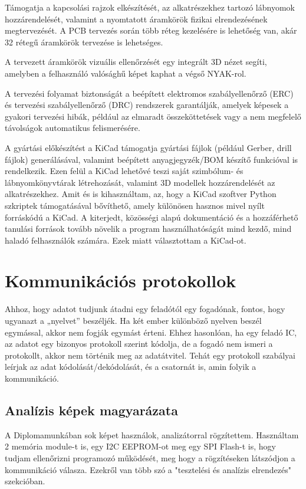 \documentclass[a4paper,12pt,oneside]{book}
\begin{document}
Támogatja a kapcsolási rajzok elkészítését, az alkatrészekhez tartozó lábnyomok hozzárendelését, valamint a nyomtatott áramkörök fizikai elrendezésének megtervezését. A PCB tervezés során több réteg kezelésére is lehetőség van, akár 32 rétegű áramkörök tervezése is lehetséges. 

A tervezett áramkörök vizuális ellenőrzését egy integrált 3D nézet segíti, amelyben a felhasználó valósághű képet kaphat a végső NYAK-rol. 

A tervezési folyamat biztonságát a beépített elektromos szabályellenőrző (ERC) és tervezési szabályellenőrző (DRC) rendszerek garantálják, amelyek képesek a gyakori tervezési hibák, például az elmaradt összeköttetések vagy a nem megfelelő távolságok automatikus felismerésére. 

A gyártási előkészítést a KiCad támogatja gyártási fájlok (például Gerber, drill fájlok) generálásával, valamint beépített anyagjegyzék/BOM készítő funkcióval is rendelkezik. Ezen felül a KiCad lehetővé teszi saját szimbólum- és lábnyomkönyvtárak létrehozását, valamint 3D modellek hozzárendelését az alkatrészekhez. 
Amit és is kihasználtam, az, hogy a KiCad szoftver Python szkriptek támogatásával bővíthető, amely különösen hasznos mivel nyílt forráskódú a KiCad. A kiterjedt, közösségi alapú dokumentáció és a hozzáférhető tanulási források tovább növelik a program használhatóságát mind kezdő, mind haladó felhasználók számára. Ezek miatt választottam a KiCad-ot.

\section{Kommunikációs protokollok}
Ahhoz, hogy adatot tudjunk átadni egy feladótól egy fogadónak, fontos, hogy ugyanazt a „nyelvet” beszéljék. Ha két ember különböző nyelven beszél egymással, akkor nem fogják egymást érteni. Ehhez hasonlóan, ha egy feladó IC, az adatot egy bizonyos protokoll szerint kódolja, de a fogadó nem ismeri a protokollt, akkor nem történik meg az adatátvitel. Tehát egy protokoll szabályai leírjak az adat kódolását/dekódolását, és a csatornát is, amin folyik a kommunikáció. 

\subsection{Analízis képek magyarázata}

A Diplomamunkában sok képet használok, analizátorral rögzítettem. Használtam 2 memória module-t is, egy I2C EEPROM-ot meg egy SPI Flash-t is, hogy tudjam ellenőrizni programozó működését, meg hogy a rögzítéseken látszódjon a kommunikáció válasza. Ezekről van több szó a "tesztelési és analízis elrendezés" szekcióban. 
\end{document}
